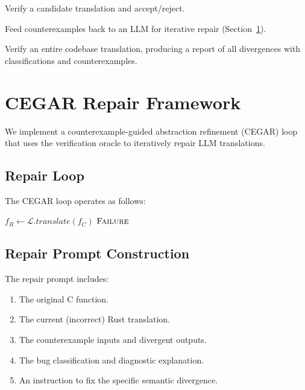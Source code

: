 \documentclass[10pt,letterpaper]{article}
\begin{document}
\begin{description}[itemsep=2pt]
\item[Single-shot verification:] Verify a candidate translation and accept/reject.
\item[CEGAR loop:] Feed counterexamples back to an LLM for iterative repair
  (Section~\ref{sec:cegar}).
\item[Batch pipeline:] Verify an entire codebase translation, producing a report
  of all divergences with classifications and counterexamples.
\end{description}

\section{CEGAR Repair Framework}
\label{sec:cegar}

We implement a counterexample-guided abstraction refinement (CEGAR) loop that uses
the verification oracle to iteratively repair LLM translations.

\subsection{Repair Loop}

The CEGAR loop operates as follows:

\begin{algorithm}[t]
\SetAlgoLined
{}
$f_R \leftarrow \mathcal{L}.\mathit{translate}(f_C)$\;
\Return $\textsc{Failure}$\;
\caption{CEGAR Repair Loop}
\label{alg:cegar}
\end{algorithm}

\subsection{Repair Prompt Construction}

The repair prompt includes:
\begin{enumerate}[itemsep=1pt]
\item The original C function.
\item The current (incorrect) Rust translation.
\item The counterexample inputs and divergent outputs.
\item The bug classification and diagnostic explanation.
\item An instruction to fix the specific semantic divergence.
\end{enumerate}
\end{document}
